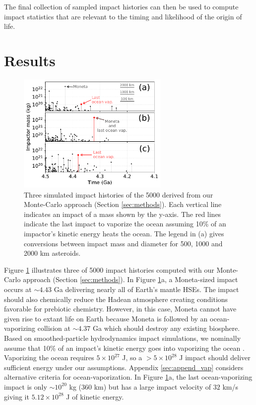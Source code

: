 \documentclass{aastex631}
\begin{document}
The final collection of sampled impact histories can then be used to compute impact statistics that are relevant to the timing and likelihood of the origin of life.

\section{Results} \label{sec:results}

\begin{figure}
  \centering
  \includegraphics[width=0.65\textwidth]{figures/example_impact_histories.pdf}
  \caption{Three simulated impact histories of the 5000 derived from our Monte-Carlo approach (Section \ref{sec:methods}). Each vertical line indicates an impact of a mass shown by the y-axis. The red lines indicate the last impact to vaporize the ocean assuming 10\% of an impactor's kinetic energy heats the ocean. The legend in (a) gives conversions between impact mass and diameter for 500, 1000 and 2000 km asteroids.}
  \label{fig:example_impact_histories}
\end{figure}

Figure \ref{fig:example_impact_histories} illustrates three of 5000 impact histories computed with our Monte-Carlo approach (Section \ref{sec:methods}). In Figure \ref{fig:example_impact_histories}a, a Moneta-sized impact occurs at $\sim 4.43$ Ga delivering nearly all of Earth's mantle HSEs. The impact should also chemically reduce the Hadean atmosphere creating conditions favorable for prebiotic chemistry. However, in this case, Moneta cannot have given rise to extant life on Earth because Moneta is followed by an ocean-vaporizing collision at $\sim 4.37$ Ga which should destroy any existing biosphere. Based on smoothed-particle hydrodynamics impact simulations, we nominally assume that 10\% of an impact's kinetic energy goes into vaporizing the ocean \citep[Appendix \ref{sec:append_vap},][]{Citron_2022}. Vaporizing the ocean requires $5 \times 10^{27}$ J, so a $> 5 \times 10^{28}$ J impact should deliver sufficient energy under our assumptions. Appendix \ref{sec:append_vap} considers alternative criteria for ocean-vaporization. In Figure \ref{fig:example_impact_histories}a, the last ocean-vaporizing impact is only $\sim 10^{20}$ kg (360 km) but has a large impact velocity of $32$ km/s giving it $5.12 \times 10^{28}$ J of kinetic energy. 
\end{document}
